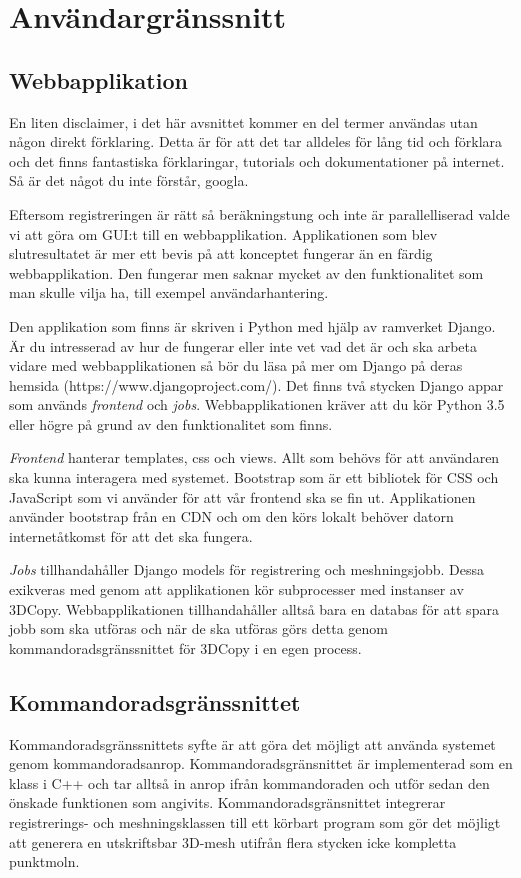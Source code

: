 \documentclass[a4paper,titlepage,12pt]{article}
\begin{document}
\newpage

\section{Användargränssnitt}
\subsection{Webbapplikation}
En liten disclaimer, i det här avsnittet kommer en del termer användas utan någon direkt förklaring. Detta är för att det tar alldeles för lång tid och förklara och det finns fantastiska förklaringar, tutorials och dokumentationer på internet. Så är det något du inte förstår, googla.

Eftersom registreringen är rätt så beräkningstung och inte är parallelliserad valde vi att göra om GUI:t till en webbapplikation. Applikationen som blev slutresultatet är mer ett bevis på att konceptet fungerar än en färdig webbapplikation. Den fungerar men saknar mycket av den funktionalitet som man skulle vilja ha, till exempel användarhantering. 

Den applikation som finns är skriven i Python med hjälp av ramverket Django. Är du intresserad av hur de fungerar eller inte vet vad det är och ska arbeta vidare med webbapplikationen så bör du läsa på mer om Django på deras hemsida (https://www.djangoproject.com/). Det finns två stycken Django appar som används \textit{frontend} och \textit{jobs}. Webbapplikationen kräver att du kör Python 3.5 eller högre på grund av den funktionalitet som finns.

\textit{Frontend} hanterar templates, css och views. Allt som behövs för att användaren ska kunna interagera med systemet. Bootstrap som är ett bibliotek för CSS och JavaScript som vi använder för att vår frontend ska se fin ut. Applikationen använder bootstrap från en CDN och om den körs lokalt behöver datorn internetåtkomst för att det ska fungera.

\textit{Jobs} tillhandahåller Django models för registrering och meshningsjobb. Dessa exikveras med genom att applikationen kör subprocesser med instanser av 3DCopy. Webbapplikationen tillhandahåller alltså bara en databas för att spara jobb som ska utföras och när de ska utföras görs detta genom kommandoradsgränssnittet för 3DCopy i en egen process.
 
\subsection{Kommandoradsgränssnittet}
Kommandoradsgränssnittets syfte är att göra det möjligt att använda systemet genom kommandoradsanrop. Kommandoradsgränsnittet är implementerad som en klass i C++ och tar alltså in anrop ifrån kommandoraden och utför sedan den önskade funktionen som angivits. Kommandoradsgränsnittet integrerar registrerings- och meshningsklassen till ett körbart program som gör det möjligt att generera en utskriftsbar 3D-mesh utifrån flera stycken icke kompletta punktmoln.
\end{document}
